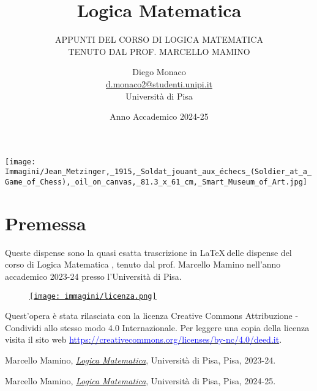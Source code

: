 \documentclass[11pt,headheight=35pt]{scrartcl}
\begin{document}
\title{Logica Matematica}
\subtitle{\large\normalfont\rmfamily\scshape APPUNTI DEL CORSO DI LOGICA MATEMATICA \\ TENUTO DAL PROF. MARCELLO MAMINO}
\author{Diego Monaco \\ \textnormal{\textcolor{purple}{\href{mailto:d.monaco2@studenti.unipi.it}{d.monaco2@studenti.unipi.it}}} \\ Università di Pisa}
\date{Anno Accademico 2024-25}
\maketitle
\begin{center}
    \texttt{[image: Immagini/Jean\_Metzinger,\_1915,\_Soldat\_jouant\_aux\_échecs\_(Soldier\_at\_a\_Game\_of\_Chess),\_oil\_on\_canvas,\_81.3\_x\_61\_cm,\_Smart\_Museum\_of\_Art.jpg]}
\end{center}
\newpage

\tableofcontents
\newpage

\section*{Premessa}
Queste dispense sono la quasi esatta trascrizione in \LaTeX\,delle dispense del corso di Logica Matematica \cite{mamino_logica_23_24}, tenuto dal prof. Marcello Mamino nell'anno accademico 2023-24 presso l'Università di Pisa.

\vfill
\begin{wrapfigure}{R}{0.2\textwidth}
	\href{https://creativecommons.org/licenses/by-nc/4.0/deed.it}{\texttt{[image: immagini/licenza.png]}}
\end{wrapfigure}
Quest'opera è stata rilasciata con la licenza Creative Commons Attribuzione - Condividi allo stesso modo 4.0 Internazionale.
Per leggere una copia della licenza visita il sito web \href{http://creativecommons.org/licenses/by-sa/4.0/deed.it}{\textcolor{blue}{https://creativecommons.org/licenses/by-nc/4.0/deed.it}}.

\newpage




\begin{thebibliography}{9}
	Marcello Mamino,
	\href{https://ciovil.li/logica23/}{\textit{Logica Matematica}},
	Università di Pisa, Pisa,
	2023-24.

	Marcello Mamino,
	\href{https://ciovil.li/logica24/}{\textit{Logica Matematica}},
	Università di Pisa, Pisa,
	2024-25.
\end{thebibliography}
\end{document}
